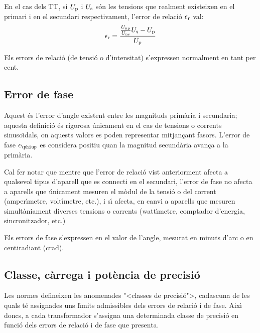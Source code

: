 En el cas dels TT, si $U_\mathrm{p}$ i $U_\mathrm{s}$ s\'{o}n les tensions que
realment existeixen en el primari i en el secundari respectivament,
l'error de relaci\'{o} $\epsilon_\mathrm{r}$ val:
\begin{equation}
    \epsilon_\mathrm{r} = \frac{\frac{U_\mathrm{np}}{U_\mathrm{ns}} U_\mathrm{s} - U_\mathrm{p}} {U_\mathrm{p}}
\end{equation}

Els errors de relaci\'{o} (de tensi\'{o} o d'intensitat) s'expressen
normalment en tant per cent.

\subsection{Error de fase}

Aquest \'{e}s l'error d'angle  existent entre les magnituds prim\`{a}ria i
secundaria; aquesta definici\'{o} \'{e}s rigorosa \'{u}nicament en el cas de
tensions o corrents sinuso\"{\i}dals, on aquests valors es poden
representar mitjan\c{c}ant fasors. L'error de fase $\epsilon\ped{\phiup}$ es considera positiu quan la magnitud secund\`{a}ria avan\c{c}a a la prim\`{a}ria.
\index{$\epsilon\ped{\phiup}$}

 Cal fer notar que mentre que l'error de relaci\'{o}
vist anteriorment afecta a qualsevol tipus d'aparell que es
connecti en el secundari, l'error de fase no afecta a aparells que
\'{u}nicament mesuren el m\`{o}dul de la tensi\'{o} o del corrent (amper\'{\i}metre,
volt\'{\i}metre, etc.), i s\'{\i} afecta, en canvi a aparells que mesuren
simult\`{a}niament diverses tensions o corrents (watt\'{\i}metre, comptador
d'energia, sincronitzador, etc.)

Els errors de fase s'expressen en el valor de l'angle, mesurat en
minuts d'arc o en centiradiant (crad).

\subsection{Classe, c\`{a}rrega i pot\`{e}ncia de precisi\'{o}}

Les normes defineixen les anomenades {"<}classes de precisi\'{o}{">},
cadascuna de les quals t\'{e} assignades uns l\'{\i}mits admissibles dels
errors de relaci\'{o} i de fase. Aix\'{\i} doncs, a cada transformador
s'assigna una determinada classe de precisi\'{o} en funci\'{o} dels errors
de relaci\'{o} i de fase que presenta.

